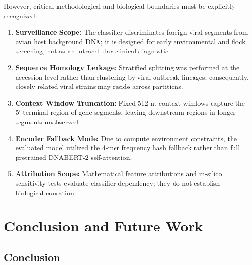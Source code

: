 \documentclass[conference]{IEEEtran}
\begin{document}
However, critical methodological and biological boundaries must be explicitly recognized:
\begin{enumerate}
    \item \textbf{Surveillance Scope:} The classifier discriminates foreign viral segments from avian host background DNA; it is designed for early environmental and flock screening, not as an intracellular clinical diagnostic.
    \item \textbf{Sequence Homology Leakage:} Stratified splitting was performed at the accession level rather than clustering by viral outbreak lineages; consequently, closely related viral strains may reside across partitions.
    \item \textbf{Context Window Truncation:} Fixed 512-nt context windows capture the 5'-terminal region of gene segments, leaving downstream regions in longer segments unobserved.
    \item \textbf{Encoder Fallback Mode:} Due to compute environment constraints, the evaluated model utilized the 4-mer frequency hash fallback rather than full pretrained DNABERT-2 self-attention.
    \item \textbf{Attribution Scope:} Mathematical feature attributions and in-silico sensitivity tests evaluate classifier dependency; they do not establish biological causation.
\end{enumerate}

\section{Conclusion and Future Work}
\label{sec:conclusion_future_work}

\subsection{Conclusion}
\end{document}
